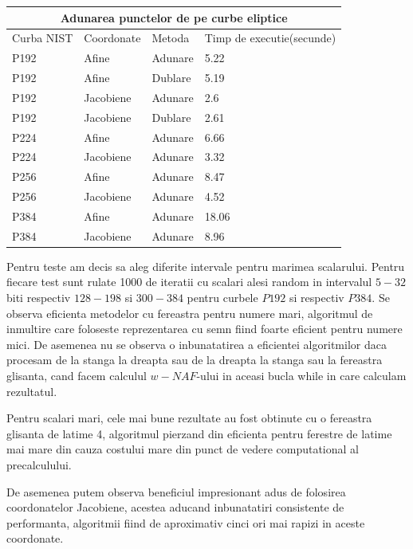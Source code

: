 \begin{tabular}{ |p{3cm}||p{3cm}|p{3cm}|p{3cm}|  }
 \hline
 \multicolumn{4}{|c|}{Adunarea punctelor de pe curbe eliptice} \\
 \hline
 Curba NIST& Coordonate &Metoda &Timp de executie(secunde)\\
 \hline
 P192   & Afine    &Adunare& 5.22\\
 P192&Afine  & Dublare & 5.19\\
 P192 &Jacobiene & Adunare& 2.6\\
 P192&Jacobiene & Dublare & 2.61\\
 P224& Afine & Adunare & 6.66\\
 P224& Jacobiene & Adunare   &3.32\\
 P256& Afine  & Adunare& 8.47\\
 P256& Jacobiene  & Adunare& 4.52\\
 P384& Afine  & Adunare& 18.06\\
 P384& Jacobiene  & Adunare& 8.96\\
 \hline
\end{tabular}

Pentru teste am decis sa aleg diferite intervale pentru marimea scalarului. Pentru fiecare test sunt rulate 1000 de iteratii cu scalari alesi random in intervalul $5-32$ biti respectiv $128-198$ si $300-384$ pentru curbele $P192$ si respectiv $P384$. Se observa eficienta metodelor cu fereastra pentru numere mari, algoritmul de inmultire care foloseste reprezentarea cu semn fiind foarte eficient pentru numere mici. De asemenea nu se observa o inbunatatirea a eficientei algoritmilor daca procesam de la stanga la dreapta sau de la dreapta la stanga sau la fereastra glisanta, cand facem calculul $w-NAF$-ului in aceasi bucla while in care calculam rezultatul.

Pentru scalari mari, cele mai bune rezultate au fost obtinute cu o fereastra glisanta de latime 4, algoritmul pierzand din eficienta pentru ferestre de latime mai mare din cauza costului mare din punct de vedere computational al precalculului. 

De asemenea putem observa beneficiul impresionant adus de folosirea coordonatelor Jacobiene, acestea aducand inbunatatiri consistente de performanta, algoritmii fiind de aproximativ cinci ori mai rapizi in aceste coordonate. 


